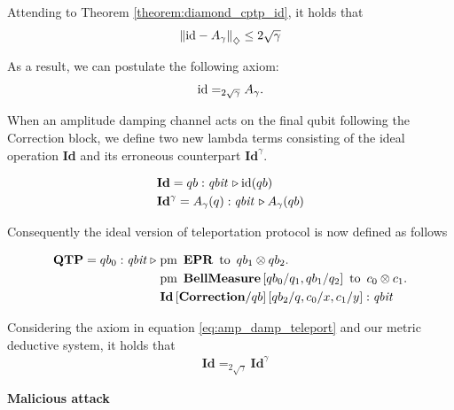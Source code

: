 \begin{example}
Attending to Theorem \ref{theorem:diamond_cptp_id}, it holds that
\begin{align*}
  \left\lVert  \mathrm{id} - A_\gamma \right\rVert_{\diamondsuit} \leq 2 \sqrt{\gamma}
\end{align*}

As a result, we can postulate the following axiom:
    \begin{align} \label{eq:amp_damp_teleport}
        \mathrm{id} =_{2 \sqrt{\gamma}} A_\gamma.
    \end{align}


When an amplitude damping channel acts on the final qubit following the Correction block, we define two new lambda terms consisting of the ideal operation \textbf{Id} and its erroneous counterpart  $\textbf{Id}^{\gamma}$.

\begin{align}\label{eq:id_error_teleport}
  &\textbf{Id} = qb:\textit{qbit} \, \triangleright \mathrm{id} (qb) \\
  & \textbf{Id}^{\gamma} = A_{\gamma} (q):\textit{qbit} \, \triangleright  A_{\gamma} (qb)
\end{align}


Consequently the ideal version of teleportation protocol is now defined as follows

\begin{align*} 
  \textbf{QTP} = qb_{0}: \textit{qbit}\hspace{3 pt} \triangleright \hspace{3 pt} & \text{pm} \hspace{5pt} \textbf{EPR} \hspace{5pt} \text{to} \hspace{5pt}  qb_{1} \otimes qb_{2}.  \notag \\
     & \text{pm}\hspace{5pt} \textbf{BellMeasure}\, [qb_0/q_1,qb_{1}/q_2] \hspace{5pt}  \text{to} \hspace{5pt} c_{0}\otimes c_{1} . \notag \\
     & \textbf{Id} \, [ \textbf{Correction}/qb] \, [qb_{2}/q,c_{0}/x, c_{1}/y] 
     : \emph{qbit}  
 \end{align*}

 Considering the axiom in equation \eqref{eq:amp_damp_teleport} and our metric deductive system, it holds that 
\begin{align*}
  &\textbf{Id}=_{2 \sqrt{\gamma}} \textbf{Id}^{\gamma}
\end{align*}

\textbf{Malicious attack}


\end{example}
